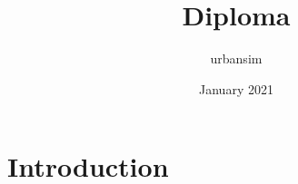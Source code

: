 \documentclass{article}
\title{Diploma}
\author{urbansim }
\date{January 2021}
\begin{document}
\maketitle

\section{Introduction}
\end{document}
